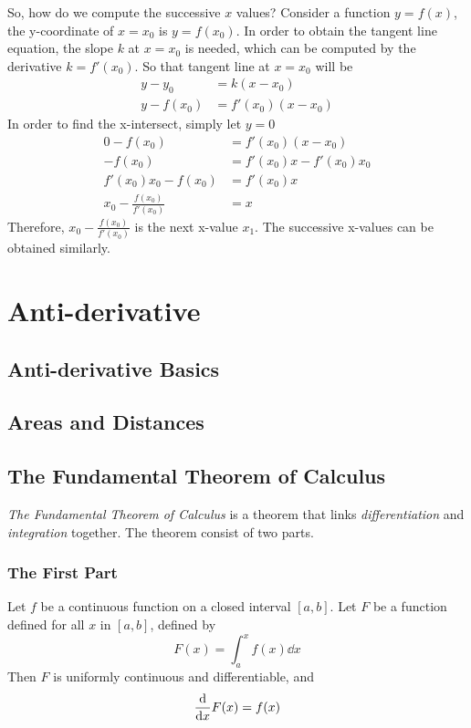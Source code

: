 \documentclass{note}
\begin{document}
So, how do we compute the successive $x$ values? Consider a function $y=f(x)$, the y-coordinate of $x=x_0$ is $y=f(x_0)$. In order to obtain the tangent line equation, the slope $k$ at $x=x_0$ is needed, which can be computed by the derivative $k = f'(x_0)$. So that tangent line at $x = x_0$ will be
\begin{align*}
  y - y_0    & = k (x - x_0)       \\
  y - f(x_0) & = f'(x_0) (x - x_0)
\end{align*}
In order to find the x-intersect, simply let $y = 0$
\begin{align*}
  0 - f(x_0)                   & = f'(x_0) (x - x_0)       \\
  - f(x_0)                     & = f'(x_0) x - f'(x_0) x_0 \\
  f'(x_0) x_0 - f(x_0)         & = f'(x_0) x               \\
  x_0 - \frac{f(x_0)}{f'(x_0)} & = x
\end{align*}
Therefore, $x_0 - \frac{f(x_0)}{f'(x_0)}$ is the next x-value $x_1$. The successive x-values can be obtained similarly.

\chapter{Anti-derivative}
\section{Anti-derivative Basics}
\section{Areas and Distances}
\section{The Fundamental Theorem of Calculus}

\textit{The Fundamental Theorem of Calculus} is a theorem that links \textit{differentiation} and \textit{integration} together. The theorem consist of two parts.

\subsection{The First Part}

Let $f$ be a continuous function on a closed interval $[a, b]$. Let $F$ be a function defined for all $x$ in $[a, b]$, defined by 
\begin{equation*}
    F(x) = \int_a^x f(x) \dd{x}
\end{equation*}
Then $F$ is uniformly continuous and differentiable, and 
\begin{equation*}
    \dv{x} F(x) = f(x)
\end{equation*}
\end{document}
